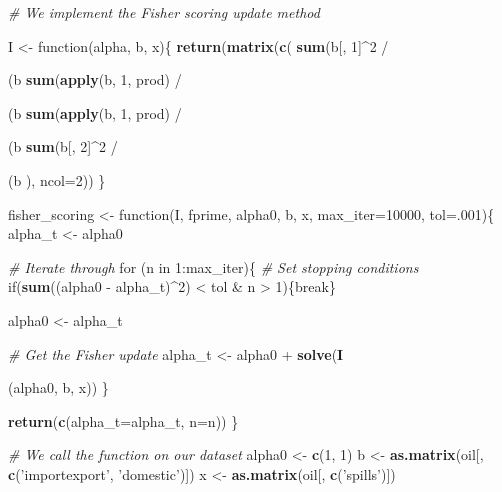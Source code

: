 \documentclass[]{article}
\newenvironment{Shaded}{\begin{snugshade}}{\end{snugshade}}
\newcommand{\KeywordTok}[1]{\textcolor[rgb]{0.13,0.29,0.53}{\textbf{{#1}}}}
\newcommand{\DataTypeTok}[1]{\textcolor[rgb]{0.13,0.29,0.53}{{#1}}}
\newcommand{\DecValTok}[1]{\textcolor[rgb]{0.00,0.00,0.81}{{#1}}}
\newcommand{\StringTok}[1]{\textcolor[rgb]{0.31,0.60,0.02}{{#1}}}
\newcommand{\CommentTok}[1]{\textcolor[rgb]{0.56,0.35,0.01}{\textit{{#1}}}}
\newcommand{\NormalTok}[1]{{#1}}
\begin{document}
\begin{Shaded}
\begin{Highlighting}[]
\CommentTok{# We implement the Fisher scoring update method}

\NormalTok{I <-}\StringTok{ }\NormalTok{function(alpha, b, x)\{}
  \KeywordTok{return}\NormalTok{(}\KeywordTok{matrix}\NormalTok{(}\KeywordTok{c}\NormalTok{(}
    \KeywordTok{sum}\NormalTok{(b[, }\DecValTok{1}\NormalTok{]^}\DecValTok{2} \NormalTok{/}\StringTok{ }\NormalTok{(b %
    \KeywordTok{sum}\NormalTok{(}\KeywordTok{apply}\NormalTok{(b, }\DecValTok{1}\NormalTok{, prod) /}\StringTok{ }\NormalTok{(b %
    \KeywordTok{sum}\NormalTok{(}\KeywordTok{apply}\NormalTok{(b, }\DecValTok{1}\NormalTok{, prod) /}\StringTok{ }\NormalTok{(b %
    \KeywordTok{sum}\NormalTok{(b[, }\DecValTok{2}\NormalTok{]^}\DecValTok{2} \NormalTok{/}\StringTok{ }\NormalTok{(b %
  \NormalTok{), }\DataTypeTok{ncol=}\DecValTok{2}\NormalTok{))}
\NormalTok{\}}

\NormalTok{fisher_scoring <-}\StringTok{ }\NormalTok{function(I, fprime, alpha0, b, x, }\DataTypeTok{max_iter=}\DecValTok{10000}\NormalTok{, }\DataTypeTok{tol=}\NormalTok{.}\DecValTok{001}\NormalTok{)\{}
  \NormalTok{alpha_t <-}\StringTok{ }\NormalTok{alpha0}
  
  \CommentTok{# Iterate through }
  \NormalTok{for (n in }\DecValTok{1}\NormalTok{:max_iter)\{}
    \CommentTok{# Set stopping conditions}
    \NormalTok{if(}\KeywordTok{sum}\NormalTok{((alpha0 -}\StringTok{ }\NormalTok{alpha_t)^}\DecValTok{2}\NormalTok{) <}\StringTok{ }\NormalTok{tol &}\StringTok{ }\NormalTok{n >}\StringTok{ }\DecValTok{1}\NormalTok{)\{break\}}
    
    \NormalTok{alpha0 <-}\StringTok{ }\NormalTok{alpha_t}
    
    \CommentTok{# Get the Fisher update}
    \NormalTok{alpha_t <-}\StringTok{ }\NormalTok{alpha0 +}\StringTok{ }\KeywordTok{solve}\NormalTok{(}\KeywordTok{I}\NormalTok{(alpha0, b, x)) %
  \NormalTok{\}}
  
  \KeywordTok{return}\NormalTok{(}\KeywordTok{c}\NormalTok{(}\DataTypeTok{alpha_t=}\NormalTok{alpha_t, }\DataTypeTok{n=}\NormalTok{n))}
\NormalTok{\}}

\CommentTok{# We call the function on our dataset}
\NormalTok{alpha0 <-}\StringTok{ }\KeywordTok{c}\NormalTok{(}\DecValTok{1}\NormalTok{, }\DecValTok{1}\NormalTok{)}
\NormalTok{b <-}\StringTok{ }\KeywordTok{as.matrix}\NormalTok{(oil[, }\KeywordTok{c}\NormalTok{(}\StringTok{'importexport'}\NormalTok{, }\StringTok{'domestic'}\NormalTok{)])}
\NormalTok{x <-}\StringTok{ }\KeywordTok{as.matrix}\NormalTok{(oil[, }\KeywordTok{c}\NormalTok{(}\StringTok{'spills'}\NormalTok{)])}

}}}}}
\end{Highlighting}
\end{Shaded}
\end{document}
